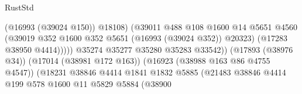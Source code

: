 \begin{lexlean}{RustStd}
\begin{coremodule}
{\begin{coremodule}
{{{{{{{{{{{{{{{{{{{{{{{{{{{{{{{{{{{{{{{{{{{{{{{{{{{{{{{                                                            (@16993 (@39024 @150))
                                                            @18108)
                                                          (@39011
                                                            @488
                                                            @108
                                                            @1600
                                                            @14
                                                            @5651
                                                            @4560
                                                            (@39019
                                                              @352
                                                              @1600
                                                              @352
                                                              @5651
                                                              (@16993 (@39024 @352))
                                                              @20323)
                                                            (@17283 @38950 @4414)))))
                                                    @35274
                                                    @35277
                                                    @35280
                                                    @35283
                                                    @33542))
                                                (@17893 (@38976 @34))
                                                (@17014 (@38981 @172 @163))
                                                (@16923 (@38988 @163 @86 @4755 @4547))
                                                (@18231
                                                  @38846
                                                  @4414
                                                  @1841
                                                  @1832
                                                  @5885
                                                  (@21483
                                                    @38846
                                                    @4414
                                                    @199
                                                    @578
                                                    @1600
                                                    @11
                                                    @5829
                                                    @5884
                                                    (@38900
}}}}}}}}}}}}}}}}}}}}}}}}}}}}}}}}}}}}}}}}}}}}}}}}}}}}}}}
\end{coremodule}}
\end{coremodule}
\end{lexlean}
